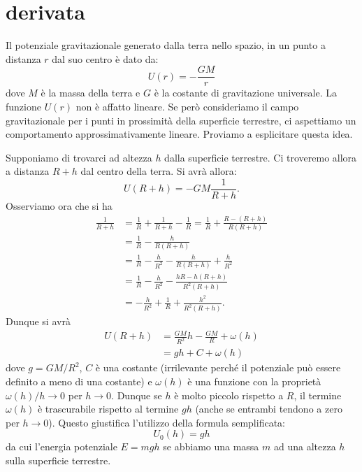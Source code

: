 \section{derivata}

Il potenziale gravitazionale generato dalla terra nello spazio, in un punto
a distanza $r$ dal suo centro è dato da:
\[
U(r) = -\frac{GM}{r}
\]
dove $M$ è la massa della terra e $G$ è la costante di gravitazione universale.
La funzione $U(r)$ non è affatto lineare. Se però consideriamo il
campo gravitazionale per i punti in prossimità della
superficie terrestre, ci aspettiamo un comportamento approssimativamente
lineare. Proviamo a esplicitare questa idea.

Supponiamo di trovarci ad altezza $h$ dalla superficie terrestre. Ci
troveremo allora a distanza $R+h$ dal centro della terra. Si avrà allora:
\[
  U(R+h) = -GM\frac{1}{R+h}.
\]
Osserviamo ora che si ha
\begin{align*}
  \frac{1}{R+h}
  & = \frac{1}{R} + \frac{1}{R+h} - \frac{1}{R}
   = \frac 1 R + \frac{R-(R+h)}{R(R+h)} \\
  & = \frac 1 R - \frac{h}{R(R+h)} \\
  & = \frac 1 R - \frac{h}{R^2} - \frac{h}{R(R+h)} + \frac{h}{R^2} \\
  & = \frac 1 R - \frac{h}{R^2} - \frac{hR - h(R + h)}{R^2(R+h)} \\
  & = - \frac{h}{R^2} + \frac 1 R + \frac{h^2}{R^2(R+h)}.
\end{align*}
Dunque si avrà
\begin{align*}
  U(R+h) &= \frac{GM}{R^2} h - \frac{GM}{R} + \omega(h)\\
  &= g h + C + \omega(h)
\end{align*}
dove $g = GM/R^2$, $C$ è una costante (irrilevante perché il
potenziale può essere definito a meno di una costante) e
$\omega(h)$ è una funzione con la proprietà $\omega(h)/h\to 0$
per $h\to 0$. Dunque se $h$ è molto piccolo rispetto a $R$, il termine
$\omega(h)$ è trascurabile rispetto al termine $gh$ (anche se entrambi
tendono a zero per $h\to 0$). Questo giustifica
l'utilizzo della formula
semplificata:
\[
U_0(h) = gh
\]
da cui l'energia potenziale $E = mgh$
se abbiamo una massa $m$ ad una altezza $h$ sulla superficie terrestre.

